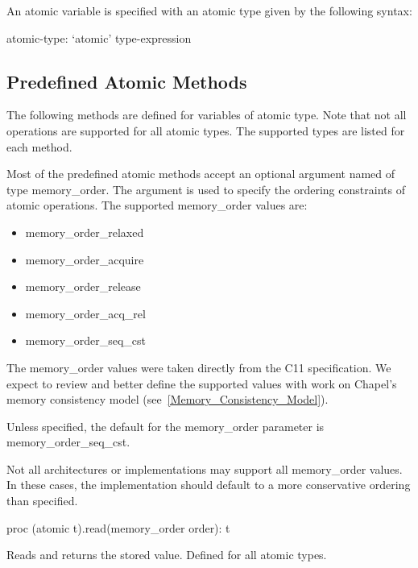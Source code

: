 An atomic variable is specified with an atomic type given by the
following syntax:

\begin{syntax}
atomic-type:
  `atomic' type-expression
\end{syntax}

\subsection{Predefined Atomic Methods}
\label{Functions_on_Atomic_Variables}

The following methods are defined for variables of atomic type. Note
that not all operations are supported for all atomic types. The
supported types are listed for each method.

Most of the predefined atomic methods accept an optional argument
named  of type memory\_order. The  argument is
used to specify the ordering constraints of atomic operations. The
supported memory\_order values are:
\begin{itemize}
\item{memory\_order\_relaxed}
\item{memory\_order\_acquire}
\item{memory\_order\_release}
\item{memory\_order\_acq\_rel}
\item{memory\_order\_seq\_cst}
\end{itemize}

\begin{openissue}
  The memory\_order values were taken directly from the C11
  specification.  We expect to review and better define the supported
  values with work on Chapel's memory consistency model
  (see~\ref{Memory_Consistency_Model}).
\end{openissue}

Unless specified, the default for the memory\_order parameter is
memory\_order\_seq\_cst.

\begin{note}
Not all architectures or implementations may support all memory\_order
values.  In these cases, the implementation should default to a more
conservative ordering than specified.
\end{note}

\begin{protohead}
proc (atomic t).read(memory_order order): t
\end{protohead}
\begin{protobody}
Reads and returns the stored value. Defined for all atomic types.
\end{protobody}

